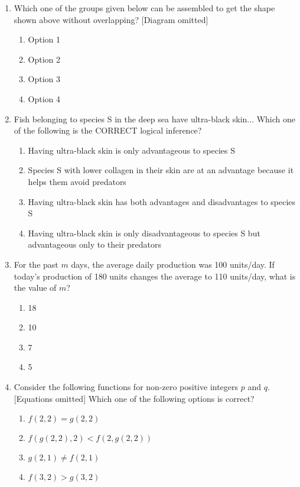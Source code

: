 \documentclass[12pt,a4paper]{article}
\begin{document}
\begin{enumerate}
\item Which one of the groups given below can be assembled to get the shape shown above without overlapping? [Diagram omitted]
\begin{enumerate}
    \item Option 1
    \item Option 2
    \item Option 3
    \item Option 4
\end{enumerate}

\item Fish belonging to species S in the deep sea have ultra-black skin... Which one of the following is the CORRECT logical inference?
\begin{enumerate}
    \item Having ultra-black skin is only advantageous to species S
    \item Species S with lower collagen in their skin are at an advantage because it helps them avoid predators
    \item Having ultra-black skin has both advantages and disadvantages to species S
    \item Having ultra-black skin is only disadvantageous to species S but advantageous only to their predators
\end{enumerate}

\item For the past $m$ days, the average daily production was 100 units/day. If today’s production of 180 units changes the average to 110 units/day, what is the value of $m$?
\begin{enumerate}
    \item 18
    \item 10
    \item 7
    \item 5
\end{enumerate}

\item Consider the following functions for non-zero positive integers $p$ and $q$. [Equations omitted] Which one of the following options is correct?
\begin{enumerate}
    \item $f(2,2) = g(2,2)$
    \item $f(g(2,2), 2) < f(2, g(2,2))$
    \item $g(2,1) \ne f(2,1)$
    \item $f(3,2) > g(3,2)$
\end{enumerate}


\end{enumerate}
\end{document}
